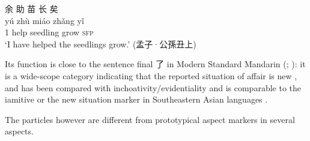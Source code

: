\documentclass[UTF8, a4paper, oneside, scheme=plain, 12pt]{ctexrep}
\newcommand*{\citepage}[1]{p.~{#1}}
\newcommand{\translate}[1]{`#1'}
\newcommand*{\category}[1]{\textsc{#1}}
\begin{document}
\begin{exe}
    \ex\label{ex:grammatical.clause.force.sentential-aspect.yi.1}
    \glll 余 助 苗 长 矣 \\
    yú zhù miáo zhǎng yǐ \\
    1 help seedling grow \category{sfp} \\
    \glt\translate{I have helped the seedlings grow.} \hfill (孟子·公孫丑上)
\end{exe}


Its function is close to the sentence final 了 in Modern Standard Mandarin
(\citealt{paul2014particles}; \citealt{pan2021sentence}):
it is a wide-scope category indicating that the reported situation of affair is new
\citep[\citepage{116}]{pulleyblank1995outline},
and has been compared with inchoativity/evidentiality \citep{tsai2008tense}
and is comparable to the iamitive or the new situation marker in Southeastern Asian languages \citep{mazzitelli2025aspect}.





The particles however are different from prototypical aspect markers in several aspects.
\end{document}
